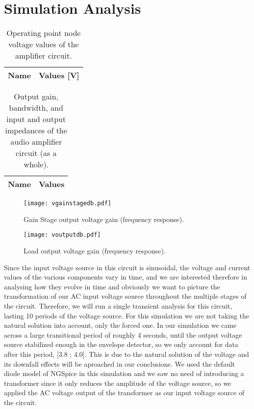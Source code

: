 \newpage
\section{Simulation Analysis}
\label{sec:simulation}

\begin{table}[h]
  \centering
  \begin{tabular}{|l|r|}
    \hline    
    {\bf Name} & {\bf Values [V]} \\ \hline
     
  \end{tabular}
  \caption{Operating point node voltage values of the amplifier circuit.}
  \label{tab:operator}
\end{table}

\begin{table}[h]
  \centering
  \begin{tabular}{|l|r|}
    \hline    
    {\bf Name} & {\bf Values} \\ \hline
    
         
  \end{tabular}
  \caption{Output gain, bandwidth, and input and output impedances of the audio amplifier circuit (as a whole).}
  \label{tab:main}
\end{table}

\begin{figure}[!h] \centering
\texttt{[image: vgainstagedb.pdf]}
\caption{Gain Stage output voltage gain (frequency response).}
\label{fig:gainstage}
\end{figure}

\begin{figure}[!h] \centering
\texttt{[image: voutputdb.pdf]}
\caption{Load output voltage gain (frequency response).}
\label{fig:outputstage}
\end{figure}



Since the input voltage source in this circuit is sinusoidal, the voltage and current values of the various components vary in time, and we are interested therefore in analysing how they evolve in time and obviously we want to picture the transformation of our AC input voltage source throughout the multiple stages of the circuit. Therefore, we will run a single transient analysis for this circuit, lasting 10 periods of the voltage source. For this simulation we are not taking the natural solution into account, only the forced one. In our simulation we came across a large transitional period of roughly 4 seconds, until the output voltage source stabilized enough in the envelope detector, so we only account for data after this period, [3.8 ; 4.0]. This is due to the natural solution of the voltage and its downfall effects will be aproached in our conclusions. We used the default diode model of NGSpice in this simulation and we saw no need of introducing a transformer since it only reduces the amplitude of the voltage source, so we applied the AC voltage output of the transformer as our input voltage source of the circuit.
